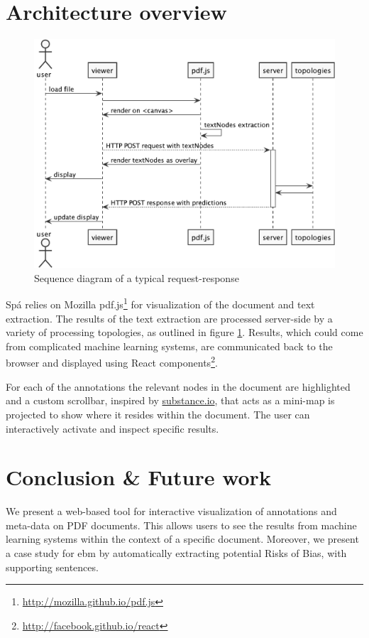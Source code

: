 \documentclass[runningheads,a4paper]{llncs}
\begin{document}
\section{Architecture overview}
\label{section:architecture}
\begin{figure}[htb]
\centering
\includegraphics[width=.9\linewidth]{./diagrams/sequence.pdf}
\caption{\label{fig:sequence}Sequence diagram of a typical request-response}
\end{figure}
Spá relies on Mozilla pdf.js\footnote{\url{http://mozilla.github.io/pdf.js}} for visualization of the document and text extraction.
The results of the text extraction are processed server-side by a variety of processing topologies, as outlined in figure \ref{fig:sequence}.
Results, which could come from complicated machine learning systems, are communicated back to the browser and displayed using React components\footnote{\url{http://facebook.github.io/react}}.

For each of the annotations the relevant nodes in the document are highlighted and a custom scrollbar, inspired by \href{http://substance.io/}{substance.io}, that acts as a mini-map is projected to show where it resides within the document.
The user can interactively activate and inspect specific results.

\section{Conclusion \& Future work}
We present a web-based tool for interactive visualization of annotations and meta-data on PDF documents.
This allows users to see the results from machine learning systems within the context of a specific document.
Moreover, we present a case study for \ac{ebm} by automatically extracting potential Risks of Bias, with supporting sentences.
\end{document}
